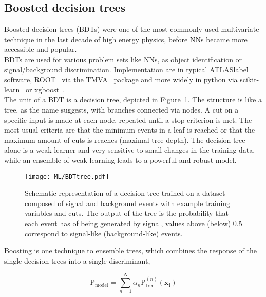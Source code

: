 \subsection{Boosted decision trees}

Boosted decision trees (BDTs) were one of the most commonly used multivariate technique in the last decade of high energy physics, before NNs became more accessible and popular. \\

BDTs are used for various problem sets like NNs, as object identification or signal/background discrimination. Implementation are in typical \acrshort{ATLASlabel} software, ROOT~\cite{BRUN199781} via the TMVA~\cite{TMVA} package and more widely in python via scikit-learn~\cite{scikit-learn} or xgboost~\cite{Chen_2016}.\\

The unit of a BDT is a decision tree, depicted in Figure~\ref{ML:BDT}. The structure is like a tree, as the name suggests, with branches connected via nodes. A cut on a specific input is made at each node, repeated until a stop criterion is met. The most usual criteria are that the minimum events in a leaf is reached or that the maximum amount of cuts is reaches (maximal tree depth). The decision tree alone is a weak learner and very sensitive to small changes in the training data, while an ensemble of weak learning leads to a powerful and robust model.
 
\begin{figure}[htbp]
    \RawFloats
    \begin{center}
    \texttt{[image: ML/BDTtree.pdf]}
    \caption{
        Schematic representation of a decision tree trained on a dataset composed of signal and background events with example training variables and cuts. The output of the tree is the probability that each event has of being generated by signal, values above (below) 0.5 correspond to signal-like (background-like) events.
    }
    \label{ML:BDT}
    \end{center}
\end{figure}

Boosting is one technique to ensemble trees, which combines the response of the single decision trees into a single discriminant,

\begin{equation}
    \text{P}_{\text{model}} = \sum_{n=1}^N \alpha_n \text{P}_{\text{tree}}^{(n)}(\mathbf{x_i})
\end{equation}

